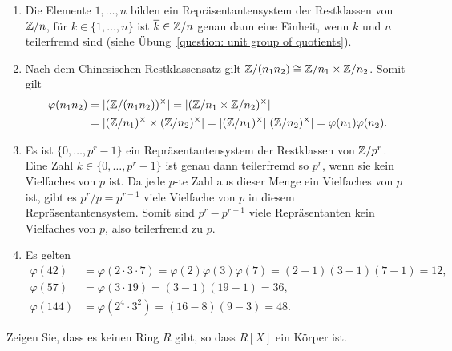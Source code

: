 \begin{solution}
  \begin{enumerate}
    \item
      Die Elemente $1, \dotsc, n$ bilden ein Repräsentantensystem der Restklassen von $\mathbb{Z}/n$, für $k \in \{1, \dotsc, n\}$ ist $\overline{k} \in \mathbb{Z}/n$ genau dann eine Einheit, wenn $k$ und $n$ teilerfremd sind (siehe Übung~\ref{question: unit group of quotients}).
    \item
      Nach dem Chinesischen Restklassensatz gilt $\mathbb{Z}/(n_1 n_2) \cong \mathbb{Z}/n_1 \times \mathbb{Z}/n_2$.
      Somit gilt
      \begin{align*}
            \varphi(n_1 n_2)
        &=  | (\mathbb{Z}/(n_1 n_2))^\times |
         =  | (\mathbb{Z}/n_1 \times \mathbb{Z}/n_2)^\times |
        \\
        &=  | (\mathbb{Z}/n_1)^\times \times (\mathbb{Z}/n_2)^\times |
         =  | (\mathbb{Z}/n_1)^\times | | (\mathbb{Z}/n_2)^\times |
         =  \varphi(n_1) \varphi(n_2).
      \end{align*}
    \item
      Es ist $\{0, \dotsc, p^r - 1\}$ ein Repräsentantensystem der Restklassen von $\mathbb{Z}/p^r$.
      Eine Zahl $k \in \{0, \dotsc, p^r - 1\}$ ist genau dann teilerfremd so $p^r$, wenn sie kein Vielfaches von $p$ ist.
      Da jede $p$-te Zahl aus dieser Menge ein Vielfaches von $p$ ist, gibt es $p^r/p = p^{r-1}$ viele Vielfache von $p$ in diesem Repräsentantensystem.
      Somit sind $p^r - p^{r-1}$ viele Repräsentanten kein Vielfaches von $p$, also teilerfremd zu $p$.
    \item
      Es gelten
      \begin{align*}
            \varphi(42)
        &=  \varphi(2 \cdot 3 \cdot 7)
         =  \varphi(2) \varphi(3) \varphi(7)
         =  (2 - 1)(3 - 1)(7 - 1)
         =  12,
        \\
            \varphi(57)
        &=  \varphi(3 \cdot 19)
         =  (3 - 1)(19 - 1)
         =  36,
        \\
            \varphi(144)
        &=  \varphi(2^4 \cdot 3^2)
         =  (16 - 8) (9 - 3)
         =  48.
      \end{align*}
  \end{enumerate}
\end{solution}


\begin{question}[subtitle = Polynomringe sind keine Körper]
  \label{qst: polynomial rings are not fields}
  Zeigen Sie, dass es keinen Ring $R$ gibt, so dass $R[X]$ ein Körper ist.
\end{question}


